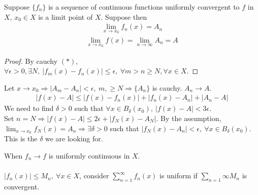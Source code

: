 \documentclass[class=scrartcl, crop=false]{standalone}
\begin{document}
\begin{theorem}
  Suppose $\{f_n\}$ is a sequence of continuous functions uniformly convergent to $f$ in $X$, $x_0 \in X$ is a limit point of $X$.
  Suppose then
  \begin{gather*}
    \lim_{x \to x_0} f_n(x) = A_n
  \end{gather*}
  \begin{gather*}
    \lim_{x \to x_0}f(x) = \lim_{n \to \infty}A_n = A
  \end{gather*}
  \begin{proof}
    By cauchy $(*)$, $\forall \epsilon > 0, \exists N, \ |f_m(x) - f_n(x)| \leq \epsilon, \ \forall m > n \geq N, \forall x \in X$.
  \end{proof} 
  Let $x \to x_0 \Rightarrow |A_m - A_n| < \epsilon, \ m, \geq N \Rightarrow \{A_n\}$ is cauchy. $A_n \to A$.
  \begin{gather*}
    |f(x) - A| \leq |f(x) - f_n(x)| + |f_n(x) - A_n| + |A_n - A|
  \end{gather*} 
  We need to find $\delta > 0$ such that $\forall x \in B_\delta(x_0), \ |f(x) - A| < 3\epsilon$.
  \\
  Set $n = N \Rightarrow |f(x) - A| \leq 2\epsilon + |f_N(x) - A_N|$. By the assumption, $\lim_{x \to x_0} f_N(x) = A_n \Rightarrow \exists \delta > 0$ such that $|f_N(x) - A_n| < \epsilon, \ \forall x \in B_\delta (x_0)$. This is the $\delta$ we are looking for.
\end{theorem} 

\begin{theorem}[M-test]
  When $f_n \to f$ is uniformly continuous in $X$.
  \\\\
  $|f_n(x)| \leq M_n, \ \forall x \in X$, consider $\sum_{n = 1}^\infty f_n(x)$ is uniform if $\sum_{n = 1}\infty M_n$ is convergent.
\end{theorem} 
\end{document}
